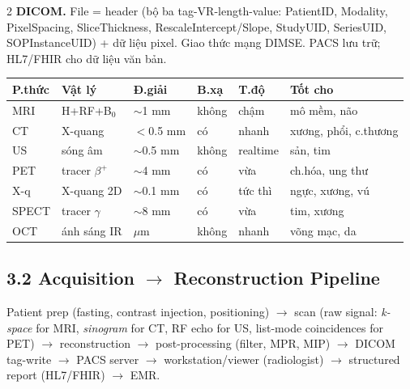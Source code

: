 \begin{paracol}{2}
\textbf{DICOM.}
File = header (bộ ba tag-VR-length-value: PatientID, Modality, PixelSpacing, SliceThickness, RescaleIntercept/Slope, StudyUID, SeriesUID, SOPInstanceUID) + dữ liệu pixel. Giao thức mạng DIMSE. PACS lưu trữ; HL7/FHIR cho dữ liệu văn bản.

\smallskip
\footnotesize
\begin{tabular}{@{}llllll@{}}
\toprule
P.thức & Vật lý & Đ.giải & B.xạ & T.độ & Tốt cho \\
\midrule
MRI & H+RF+B$_0$ & $\sim$1 mm & không & chậm & mô mềm, não \\
CT & X-quang & $<$0.5 mm & có & nhanh & xương, phổi, c.thương \\
US & sóng âm & $\sim$0.5 mm & không & realtime & sản, tim \\
PET & tracer $\beta^+$ & $\sim$4 mm & có & vừa & ch.hóa, ung thư \\
X-q & X-quang 2D & $\sim$0.1 mm & có & tức thì & ngực, xương, vú \\
SPECT & tracer $\gamma$ & $\sim$8 mm & có & vừa & tim, xương \\
OCT & ánh sáng IR & $\mu$m & không & nhanh & võng mạc, da \\
\bottomrule
\end{tabular}
\normalsize

\switchcolumn*

\subsection*{3.2 Acquisition $\to$ Reconstruction Pipeline}
Patient prep (fasting, contrast injection, positioning) $\to$ scan (raw signal: \emph{k-space} for MRI, \emph{sinogram} for CT, RF echo for US, list-mode coincidences for PET) $\to$ reconstruction $\to$ post-processing (filter, MPR, MIP) $\to$ DICOM tag-write $\to$ PACS server $\to$ workstation/viewer (radiologist) $\to$ structured report (HL7/FHIR) $\to$ EMR.

\medskip
\begin{center}
\end{center}


\end{paracol}

